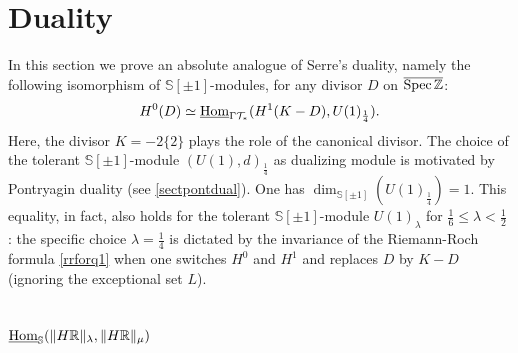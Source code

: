 \documentclass[cupthm]{CUP-JNL-JMJ}
\numberwithin{equation}{section}
\theoremstyle{cupplain}
\theoremstyle{cupdefinition}
\theoremstyle{cupremark}
\theoremstyle{cupproof}
\def\R{{\mathbb R}}
\def\S{{\mathbb S}}
\def\Z{{\mathbb Z}}
\def\cT{{\mathcal T}}
\def\Spec{{\rm Spec\,}}
\def\sss{{\S}}
\def\spm{{\sss[\pm 1]}}
\def\Hom {{\rm{Hom}}}
\def\spzb{{\overline{\Spec\Z}}}
\def\uhom{{\underline \Hom}}
\begin{document}
\section{Duality}\label{sec5}

In this section we prove an absolute analogue of  Serre's duality, namely the following isomorphism of $\spm$-modules, for any divisor $D$ on $\spzb$: 
\[
H^0(D)\simeq \uhom_{\Gamma\cT_*}(H^1(K-D),U(1)_{\frac 14}).
\]
Here, the divisor $K=-2\{2\}$ plays the role of the canonical divisor. The choice of the  tolerant $\spm$-module $(U(1),d)_{\frac 14}$ as dualizing module is motivated by  Pontryagin duality (see \ref{sectpontdual}). One has $\dim_{\spm}(U(1)_{\frac 14})=1$. This equality, in fact,  also holds for the tolerant $\spm$-module $U(1)_{\lambda} $ for $\frac 16\leq \lambda<\frac 12$ :  the specific choice $\lambda=\frac 14$ is dictated by the invariance of the Riemann-Roch formula \eqref{rrforq1} when one switches $H^0$ and $H^1$ and replaces $D$ by $K-D$ (ignoring the exceptional set $L$).

 \subsection{$\uhom_\sss(\Vert H\R\Vert_\lambda,\Vert H\R\Vert_\mu)$}
 
\end{document}
